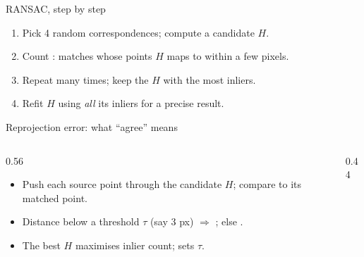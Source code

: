 \documentclass[10pt,aspectratio=169]{beamer}
\begin{document}
\begin{frame}{RANSAC, step by step}
  \begin{enumerate}
    \item Pick 4 random correspondences; compute a candidate $H$.
    \item Count : matches whose points $H$ maps to within a few pixels.
    \item Repeat many times; keep the $H$ with the most inliers.
    \item Refit $H$ using \emph{all} its inliers for a precise result.
  \end{enumerate}
\end{frame}

\begin{frame}{Reprojection error: what ``agree'' means}
  \begin{columns}[T]
    \begin{column}{0.56\textwidth}
      \begin{itemize}
        \item Push each source point through the candidate $H$; compare to its matched point.
        \item Distance below a threshold $\tau$ (say 3 px) $\Rightarrow$ ; else .
        \item The best $H$ maximises inlier count;  sets $\tau$.
      \end{itemize}
    \end{column}
    \begin{column}{0.44\textwidth}
      \begin{center}
      \end{center}
    \end{column}
  \end{columns}
\end{frame}
\end{document}
